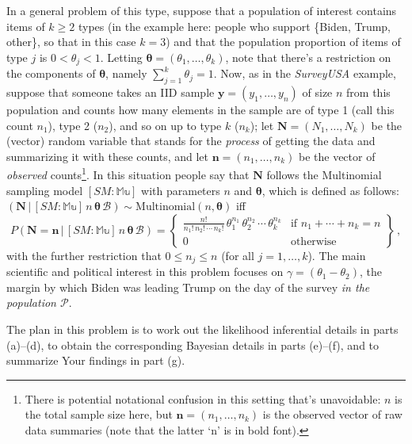 \documentclass[12pt]{article}
\newcommand{\given}{\, | \,}
\begin{document}
In a general problem of this type, suppose that a population of interest contains items of $k \ge 2$ types (in the example here: people who support \{Biden, Trump, other\}, so that in this case $k = 3$) and that the population proportion of items of type $j$ is $0 < \theta_j < 1$. Letting $\bm{ \theta } = ( \theta_1, \dots, \theta_k )$, note that there's a restriction on the components of $\bm{ \theta }$, namely $\sum_{ j = 1 }^k \theta_j = 1$. Now, as in the \textit{SurveyUSA} example, suppose that someone takes an IID sample $\bm{ y } = ( y_1, \dots, y_n )$ of size $n$ from this population and counts how many elements in the sample are of type 1 (call this count $n_1$), type 2 ($n_2$), and so on up to type $k$ ($n_k$); let $\bm{ N } = ( N_1, \dots, N_k )$ be the (vector) random variable that stands for the \textit{process} of getting the data and summarizing it with these counts, and let $\bm{ n } = ( n_1, \dots, n_k )$ be the vector of \textit{observed} counts\footnote{There is potential notational confusion in this setting that's unavoidable: $n$ is the total sample size here, but $\bm{ n } = ( n_1, \dots, n_k )$ is the observed vector of raw data summaries (note that the latter `n' is in bold font).}. In this situation people say that $\bm{ N }$ follows the Multinomial sampling model $[ SM \! \! : \mathbb{ Mu } ]$  with parameters $n$ and $\bm{ \theta }$, which is defined as follows: $( \bm{ N } \given [ SM \! \! : \mathbb{ Mu } ] \, n \, \bm{ \theta } \, \mathcal{ B } ) \sim \textrm{Multinomial} ( n, \bm{ \theta } )$ iff
\begin{equation} \label{e:multinomial-1}
P ( \bm{ N } = \bm{ n } \given [ SM \! \! : \mathbb{ Mu } ] \, n \, \bm{ \theta } \, \mathcal{ B } ) = \left\{ \begin{array}{cc} \frac{ n ! }{ n_1 ! \, n_2 ! \, \cdots \, n_k ! } \,  \theta_1^{ n_1 } \, \theta_2^{ n_2 } \, \cdots \, \theta_k^{ n_k } & \textrm{if } n_1 + \cdots + n_k = n \\ 0 & \textrm{otherwise} \end{array} \right\} \, ,
\end{equation}
with the further restriction that $0 \le n_j \le n$ (for all $j = 1, \dots, k$).
The main scientific and political interest in this problem focuses on $\gamma = ( \theta_1 - \theta_2 )$, the margin by which Biden was leading Trump on the day of the survey \textit{in the population $\mathcal{ P }$}. 

The plan in this problem is to work out the likelihood inferential details in parts (a)--(d), to obtain the corresponding Bayesian details in parts (e)--(f), and to summarize Your findings in part (g).
\end{document}
